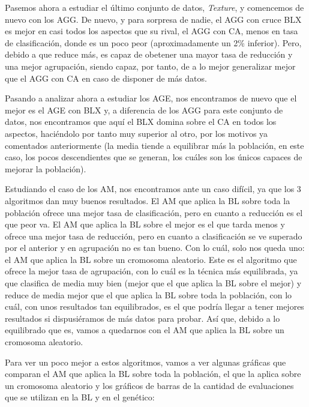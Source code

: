 \documentclass[11pt,a4paper]{article}
\begin{document}
Pasemos ahora a estudiar el último conjunto de datos, \textit{Texture}, y comencemos de nuevo con los AGG. De nuevo, y para
sorpresa de nadie, el AGG con cruce BLX es mejor en casi todos los aspectos que su rival, el AGG con CA, menos en tasa de
clasificación, donde es un poco peor (aproximadamente un 2\% inferior). Pero, debido a que reduce más, es capaz de obetener
una mayor tasa de reducción y una mejor agrupación, siendo capaz, por tanto, de a lo mejor generalizar mejor que el AGG con CA
en caso de disponer de más datos.

Pasando a analizar ahora a estudiar los AGE, nos encontramos de nuevo que el mejor es el AGE con BLX y, a diferencia de los AGG
para este conjunto de datos, nos encontramos que aquí el BLX domina sobre el CA en todos los aspectos, haciéndolo por tanto muy
superior al otro, por los motivos ya comentados anteriormente (la media tiende a equilibrar más la población, en este caso, los
pocos descendientes que se generan, los cuáles son los únicos capaces de mejorar la población).

Estudiando el caso de los AM, nos encontramos ante un caso difícil, ya que los 3 algoritmos dan muy buenos resultados. El AM que
aplica la BL sobre toda la población ofrece una mejor tasa de clasificación, pero en cuanto a reducción es el que peor va. El AM
que aplica la BL sobre el mejor es el que tarda menos y ofrece una mejor tasa de reducción, pero en cuanto a clasificación se ve
superado por el anterior y en agrupación no es tan bueno. Con lo cuál, solo nos queda uno: el AM que aplica la BL sobre un
cromosoma aleatorio. Este es el algoritmo que ofrece la mejor tasa de agrupación, con lo cuál es la técnica más equilibrada, ya
que clasifica de media muy bien (mejor que el que aplica la BL sobre el mejor) y reduce de media mejor que el que aplica la BL 
sobre toda la población, con lo cuál, con unos resultados tan equilibrados, es el que podría llegar a tener mejores resultados
si dispusiéramos de más datos para probar. Así que, debido a lo equilibrado que es, vamos a quedarnos con el AM que aplica la BL
sobre un cromosoma aleatorio.

Para ver un poco mejor a estos algoritmos, vamos a ver algunas gráficas que comparan el AM que aplica la BL sobre toda la
población, el que la aplica sobre un cromosoma aleatorio y los gráficos de barras de la cantidad de evaluaciones que se utilizan
en la BL y en el genético:
\end{document}
